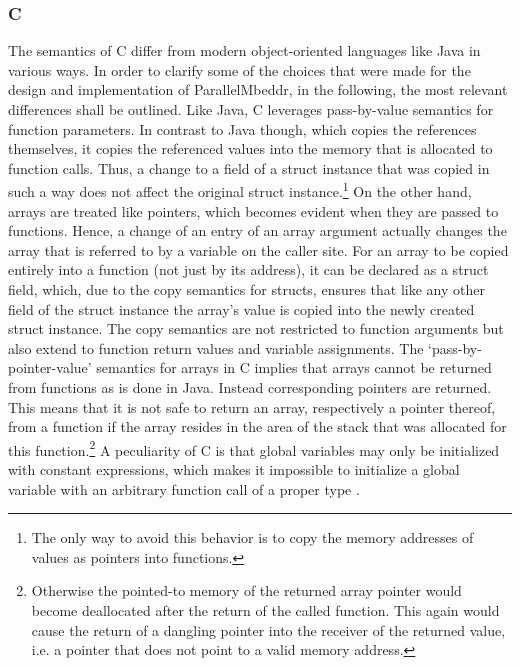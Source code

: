 \subsubsection{C}
\label{cBasics}
The semantics of C differ from modern object-oriented languages like Java in various ways. In order to clarify some of the choices that were made for the design and implementation of ParallelMbeddr, in the following, the most relevant differences shall be outlined. Like Java, C leverages pass-by-value semantics for function parameters. In contrast to Java though, which copies the references themselves, it copies the referenced values into the memory that is allocated to function calls. Thus, a change to a field of a struct instance that was copied in such a way does not affect the original struct instance.\footnote{The only way to avoid this behavior is to copy the memory addresses of values as pointers into functions.} On the other hand, arrays are treated like pointers, which becomes evident when they are passed to functions. Hence, a change of an entry of an array argument actually changes the array that is referred to by a variable on the caller site. For an array to be copied entirely into a function (not just by its address), it can be declared as a struct field, which, due to the copy semantics for structs, ensures that like any other field of the struct instance the array's value is copied into the newly created struct instance. The copy semantics are not restricted to function arguments but also extend to function return values and variable assignments. The `pass-by-pointer-value' semantics for arrays in C implies that arrays cannot be returned from functions as is done in Java. Instead corresponding pointers are returned. This means that it is not safe to return an array, respectively a pointer thereof, from a function if the array resides in the area of the stack that was allocated for this function.\footnote{Otherwise the pointed-to memory of the returned array pointer would become deallocated after the return of the called function. This again would cause the return of a dangling pointer into the receiver of the returned value, i.e. a pointer that does not point to a valid memory address.} 
A peculiarity of C is that global variables may only be initialized with constant expressions, which makes it impossible to initialize a global variable with an arbitrary function call of a proper type \cite[p.~48]{CForBASICProgrammers}.


